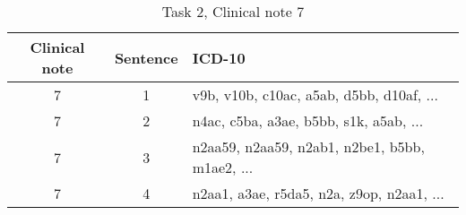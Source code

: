 \begin{table}[htbp] \footnotesize \center
\caption{Task 2, Clinical note 7 \label{tab:t2c7}}
\begin{tabularx}{\textwidth}{c c X}
    \toprule
    Clinical note & Sentence & ICD-10 \\
    \midrule
	 7 & 1 & v9b, v10b, c10ac, a5ab, d5bb, d10af, ... \\
	 7 & 2 & n4ac, c5ba, a3ae, b5bb, s1k, a5ab, ... \\
	 7 & 3 & n2aa59, n2aa59, n2ab1, n2be1, b5bb, m1ae2, ... \\
	 7 & 4 & n2aa1, a3ae, r5da5, n2a, z9op, n2aa1, ... \\
	\bottomrule
\end{tabularx}
\end{table}